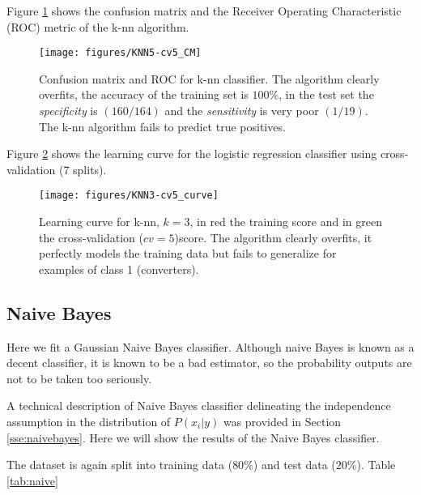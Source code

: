\documentclass[11pt]{article}
\theoremstyle{definition}
\theoremstyle{remark}
\begin{document}
Figure \ref{fig:knn-cm} shows the confusion matrix and the Receiver Operating Characteristic (ROC) metric of the k-nn algorithm. 

\begin{figure}[H]
        \centering
        \texttt{[image: figures/KNN5-cv5\_CM]}
        \caption{Confusion matrix and ROC for k-nn classifier. The algorithm clearly overfits, the accuracy of the training set is $100\%$, in the test set the \emph{specificity} is $(160/164)$ and the \emph{sensitivity} is very poor $(1/19)$. The k-nn algorithm fails to predict true positives.
        }
\label{fig:knn-cm}
\end{figure}

Figure \ref{fig:knn-cv3} shows the learning curve for the logistic regression classifier using cross-validation (7 splits).
\begin{figure}[H]
        \centering
        \texttt{[image: figures/KNN3-cv5\_curve]}
        \caption{Learning curve for k-nn, $k=3$, in red the training score and in green the cross-validation ($cv=5$)score. The algorithm clearly overfits, it perfectly models the training data but fails to generalize for examples of class 1 (converters).
        } \label{fig:knn-cv3}
\end{figure}



\subsection{Naive Bayes}
\label{se:resnaivebayes}

Here we fit a Gaussian Naive Bayes classifier. Although naive Bayes is known as a decent classifier, it is known to be a bad estimator, so the probability outputs are not to be taken too seriously. %

A technical description of Naive Bayes classifier delineating the independence assumption in the distribution of $P(x_i | y)$ was provided in Section \ref{sse:naivebayes}. Here we will show the results of the Naive Bayes classifier.

The dataset is again split into training data ($80\%$) and test data ($20\%$). Table \ref{tab:naive}
\end{document}
